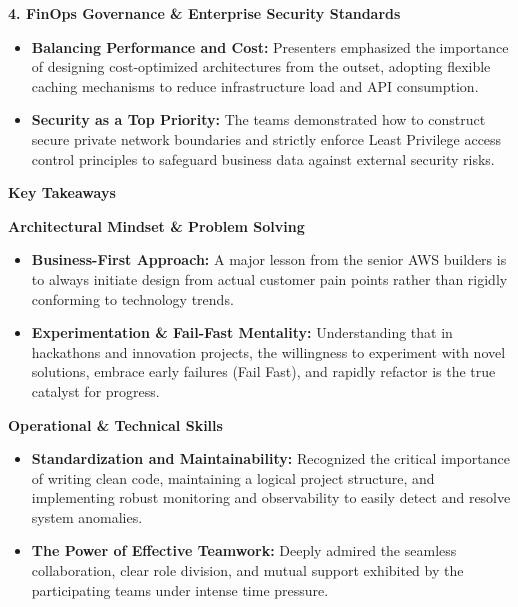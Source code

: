 \vspace{0.5em}\noindent\textbf{4. FinOps Governance \& Enterprise Security Standards}

\begin{itemize}
\tightlist
\item
  \textbf{Balancing Performance and Cost:} Presenters emphasized the
  importance of designing cost-optimized architectures from the outset,
  adopting flexible caching mechanisms to reduce infrastructure load and
  API consumption.
\item
  \textbf{Security as a Top Priority:} The teams demonstrated how to
  construct secure private network boundaries and strictly enforce Least
  Privilege access control principles to safeguard business data against
  external security risks.
\end{itemize}

\vspace{0.5em}\noindent\textbf{Key Takeaways}

\vspace{0.5em}\noindent\textbf{Architectural Mindset \& Problem Solving}

\begin{itemize}
\tightlist
\item
  \textbf{Business-First Approach:} A major lesson from the senior AWS
  builders is to always initiate design from actual customer pain points
  rather than rigidly conforming to technology trends.
\item
  \textbf{Experimentation \& Fail-Fast Mentality:} Understanding that in
  hackathons and innovation projects, the willingness to experiment with
  novel solutions, embrace early failures (Fail Fast), and rapidly
  refactor is the true catalyst for progress.
\end{itemize}

\vspace{0.5em}\noindent\textbf{Operational \& Technical Skills}

\begin{itemize}
\tightlist
\item
  \textbf{Standardization and Maintainability:} Recognized the critical
  importance of writing clean code, maintaining a logical project
  structure, and implementing robust monitoring and observability to
  easily detect and resolve system anomalies.
\item
  \textbf{The Power of Effective Teamwork:} Deeply admired the seamless
  collaboration, clear role division, and mutual support exhibited by
  the participating teams under intense time pressure.
\end{itemize}

